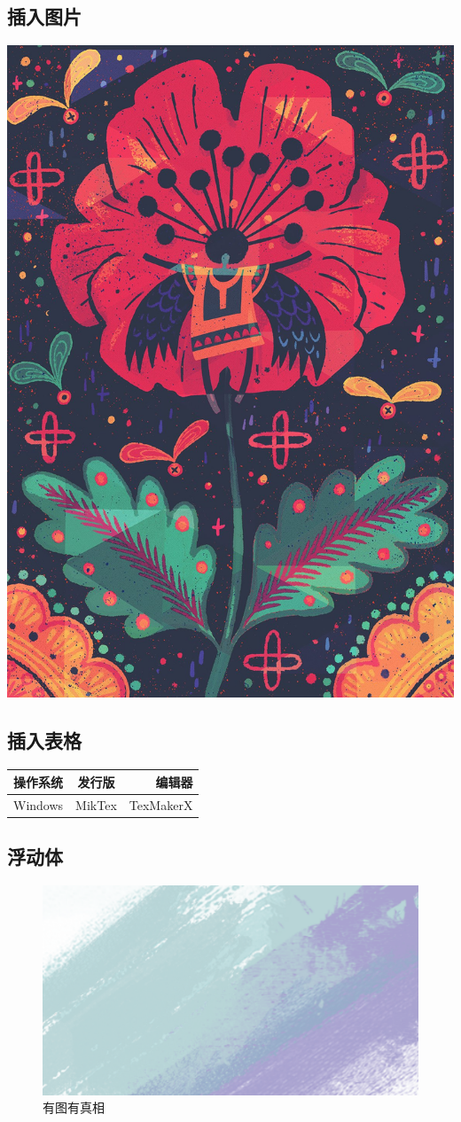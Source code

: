 \documentclass[UTF8]{ctexart}
\begin{document}
\subsection{插入图片}
\includegraphics[width = .8\textwidth]{zhangyiju.jpg}

\subsection{插入表格}
\begin{tabular}{|l|c|r|}
 \hline
操作系统 & 发行版 & 编辑器\\
 \hline
Windows & MikTex & TexMakerX\\
 \hline
\end{tabular}
\subsection{浮动体}
\begin{figure}[htbp]
\centering
\includegraphics{yiju.png}
\caption{有图有真相}
\label{fig:myphoto}
\end{figure}
\end{document}
